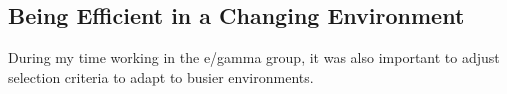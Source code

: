 \subsection{Being Efficient in a Changing Environment}
During my time working in the e/gamma group, it was also important to adjust selection criteria to adapt to busier environments. 


